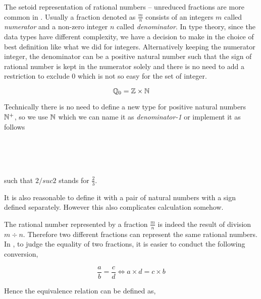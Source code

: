 The setoid representation of rational numbers -- unreduced fractions
are more common in \maths.
Usually a fraction denoted as $\frac{m}{n}$ consists of an integers
$m$ called \emph{numerator} and a non-zero integer $n$ called
\emph{denominator}.
In type theory, since the data types have different
complexity, we have a decision to make in the choice of best
definition like what we did for integers.
Alternatively keeping the numerator integer, the denominator can be a
positive natural number such that the sign of rational number is kept
in the numerator solely and there is no need to add a restriction to
exclude $0$ which is not so easy for the set of integer.

$$\mathbb{Q}_0 = \mathbb{Z} \times \mathbb{N}$$

Technically there is no need to define a new type for positive
natural numbers $\mathbb{N}^{+}$, so we use $\mathbb{N}$ which we can name it as
\emph{denominator-1} or implement it as follows

\begin{code}
\\
\>  \AgdaSymbol{:}  \<%
\\
\>[-1]\<[2]%
\>[2] \AgdaSymbol{:} \AgdaSymbol{(} \AgdaSymbol{:} \AgdaSymbol{)}  \AgdaSymbol{(} \AgdaSymbol{:} \AgdaSymbol{)}  \<%
\\
\end{code}

such that $2 /suc 2$ stands for $\frac{2}{3}$.


\begin{remark}
It is also reasonable to define it with a pair of natural numbers with
a sign defined separately. However this also complicates calculation somehow.
\end{remark}



The rational number represented by a fraction $\frac{m}{n}$ is indeed the result of
division $m \div n$. Therefore two different fractions can represent
the same rational numbers.
In \maths, to judge the equality of two fractions, it is easier to conduct the following conversion,

$$ \frac{a}{b} = \frac{c}{d} \iff a \times d = c \times b $$


Hence the equivalence relation can be defined as,

